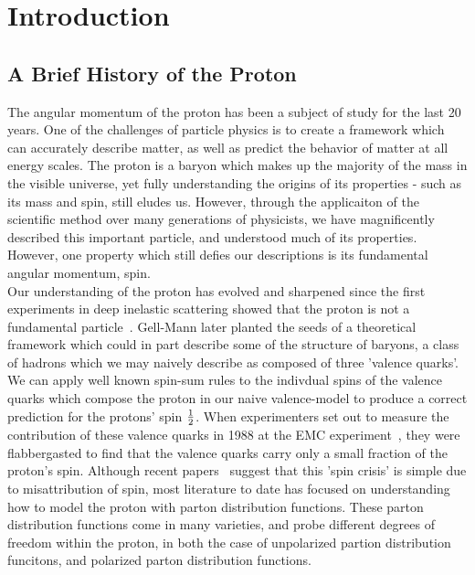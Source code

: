 \chapter{Introduction}

\section{A Brief History of the Proton}
The angular momentum of the proton has been a subject of study for the last 20
years\needcite{}. One of the challenges of particle physics is to create a
framework which can accurately describe matter, as well as predict the behavior
of matter at all energy scales. The proton is a baryon which makes up the
majority of the mass in the visible universe, yet fully understanding the
origins of its properties - such as its mass and spin, still eludes us. However,
through the applicaiton of the scientific method over many generations of
physicists, we have magnificently described this important particle, and
understood much of its properties. However, one property which still defies our
descriptions is its fundamental angular momentum, spin. \\
	
Our understanding of the proton has evolved and sharpened since the first
experiments in deep inelastic scattering showed that the proton is not a
fundamental particle~\cite{Breidenbach1969}. Gell-Mann later planted the
seeds of a theoretical framework which could in part describe some of the
structure of baryons, a class of hadrons which we may naively describe as
composed of three 'valence quarks'\needcite{}. We can apply well known spin-sum
rules to the indivdual spins of the valence quarks which compose the proton in
our naive valence-model to produce a correct prediction for the protons' spin
${1}\over{2}$. When experimenters set out to measure the contribution of these
valence quarks in 1988 at the EMC experiment~\cite{Ashman1988}, they
were flabbergasted to find that the valence quarks carry only a small fraction
of the proton's spin. Although recent papers~\cite{Povh2016} suggest that this 'spin
crisis' is simple due to misattribution of spin, most literature to date has
focused on understanding how to model the proton with parton distribution
functions. These parton distribution functions come in many varieties, and probe
different degrees of freedom within the proton, in both the case of unpolarized
partion distribution funcitons, and polarized parton distribution functions. \\
 
